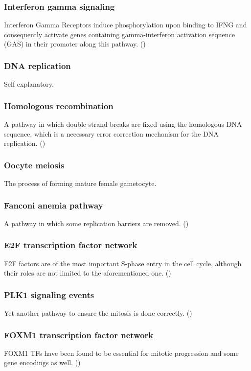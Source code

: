 \documentclass[3p,authoryear,preprint,12pt]{elsarticle}
\begin{document}
\subsubsection{Interferon gamma signaling}
Interferon Gamma Receptors induce phosphorylation upon binding to IFNG and consequently activate genes containing gamma-interferon activation sequence (GAS) in their promoter along this pathway. (\cite{Reactome INFG sig})

\subsubsection{DNA replication}
Self explanatory.

\subsubsection{Homologous recombination}
A pathway in which double strand breaks are fixed using the homologous DNA sequence, which is a necessary error correction mechanism for the DNA replication. (\cite{Reacombination})

\subsubsection{Oocyte meiosis}
The process of forming mature female gametocyte.

\subsubsection{Fanconi anemia pathway}
A pathway in which some replication barriers are removed. (\cite{Rodríguez2017})

\subsubsection{E2F transcription factor network}
E2F factors are of the most important S-phase entry in the cell cycle, although their roles are not limited to the aforementioned one. (\cite{Dimova2005})

\subsubsection{PLK1 signaling events}
Yet another pathway to ensure the mitosis is done correctly. (\cite{Lera2016})

\subsubsection{FOXM1 transcription factor network}
FOXM1 TFs have been found to be essential for mitotic progression and some gene encodings as well. (\cite{Wang2005})
\end{document}
